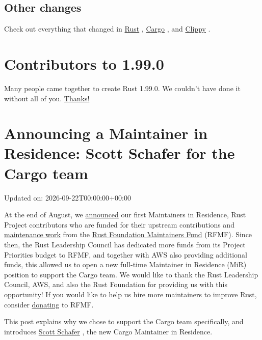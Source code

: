 \documentclass[11pt,a4paper]{article}
\begin{document}
\subsection{Other changes}

Check out everything that changed in \href{https://github.com/rust-lang/rust/releases/tag/1.99.0}{Rust} , \href{https://doc.rust-lang.org/nightly/cargo/CHANGELOG.html\#cargo-199-2026-10-01}{Cargo} , and \href{https://github.com/rust-lang/rust-clippy/blob/master/CHANGELOG.md\#rust-199}{Clippy} .

\section{Contributors to 1.99.0}

Many people came together to create Rust 1.99.0. We couldn't have done it without all of you. \href{https://thanks.rust-lang.org/rust/1.99.0/}{Thanks!}

\section{Announcing a Maintainer in Residence: Scott Schafer for the Cargo team}

Updated on: 2026-09-22T00:00:00+00:00

At the end of August, we \href{https://blog.rust-lang.org/2026/08/26/announcing-our-first-maintainers-in-residence/}{announced} our first Maintainers in Residence, Rust Project contributors who are funded for their upstream contributions and \href{https://blog.rust-lang.org/inside-rust/2026/01/12/what-is-maintenance-anyway/}{maintenance work} from the \href{https://github.com/sponsors/rustfoundation}{Rust Foundation Maintainers Fund} (RFMF). Since then, the Rust Leadership Council has dedicated more funds from its Project Priorities budget to RFMF, and together with AWS also providing additional funds, this allowed us to open a new full-time Maintainer in Residence (MiR) position to support the Cargo team. We would like to thank the Rust Leadership Council, AWS, and also the Rust Foundation for providing us with this opportunity! If you would like to help us hire more maintainers to improve Rust, consider \href{https://github.com/sponsors/rustfoundation}{donating} to RFMF.

This post explains why we chose to support the Cargo team specifically, and introduces \href{https://blog.rust-lang.org/2026/09/22/announcing-a-maintainer-in-residence-scott-schafer-for-the-cargo-team/\#introducing-scott-schafer}{Scott Schafer} , the new Cargo Maintainer in Residence.
\end{document}
